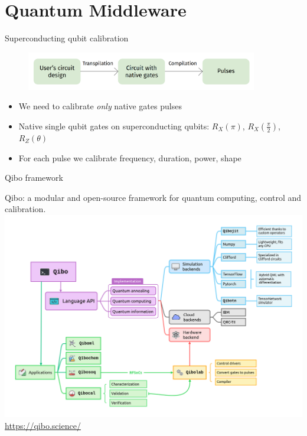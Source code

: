 \documentclass[aspectratio=169,10pt]{beamer}
\begin{document}
\section{Quantum Middleware}

\begin{frame}{Superconducting qubit calibration}
  
  \begin{figure}
    \centering
    \includegraphics[width=0.9\textwidth]{figures/calibration.png}
  \end{figure}
  \vspace{1.5em}
  \begin{itemize}
    \item We need to calibrate \textit{only} native gates pulses
    \item Native single qubit gates on superconducting qubits: $R_X(\pi)$, $R_X(\frac{\pi}{2})$, $R_Z(\theta)$
    \item For each pulse we calibrate frequency, duration, power, shape
  \end{itemize}
\end{frame}

\begin{frame}[t,fragile]{Qibo framework}
  \begin{center}
      {\small Qibo: a modular and open-source framework for quantum computing, control and calibration.}
      \includegraphics[height=0.70\paperheight]{figures/qibo_ecosystem.png}
      {\small \url{https://qibo.science/}}
  \end{center}
\end{frame}
\end{document}
